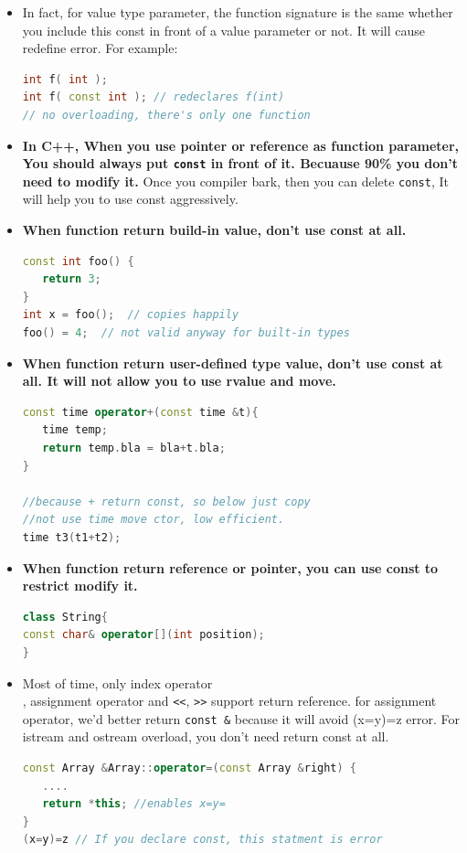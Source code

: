 \documentclass[a4paper,12pt,twoside]{book}
\begin{document}
\begin{itemize}
\item In fact, for value type parameter, the function signature is the same whether you include this const in front of a value parameter or not. It will cause redefine error. For example:
\begin{lstlisting}[frame=single, language=c++]
int f( int );
int f( const int ); // redeclares f(int)
// no overloading, there's only one function
\end{lstlisting}

\item \textbf{In C++, When you use pointer or reference as function parameter, You should always put \texttt{const} in front of it. Becuause 90\% you don't need to modify it. }Once you compiler bark, then you can delete \texttt{const}, It will help you to use const aggressively.

\item \textbf{When function return build-in value, don't use const at all. }
\begin{lstlisting}[frame=single, language=c++]
const int foo() {
   return 3;
}
int x = foo();  // copies happily
foo() = 4;  // not valid anyway for built-in types
\end{lstlisting}

\item \textbf{When function return user-defined type value, don't use const at all. It will not allow you to use rvalue and move. }
\begin{lstlisting}[frame=single, language=c++]
const time operator+(const time &t){
   time temp;
   return temp.bla = bla+t.bla;
}

//because + return const, so below just copy
//not use time move ctor, low efficient.
time t3(t1+t2);
\end{lstlisting}

\item \textbf{When function return reference or pointer, you can use const to restrict modify it.}
\begin{lstlisting}[frame=single, language=c++]
class String{
const char& operator[](int position);
}
\end{lstlisting}

\item Most of time, only index operator \[\], assignment operator and \texttt{<<}, \texttt{>>} support return reference. for assignment operator, we'd better return \texttt{const \&} because it will avoid (x=y)=z error. For istream and ostream overload, you don't need return const at all. 
\begin{lstlisting}[frame=single, language=c++]
const Array &Array::operator=(const Array &right) {
   ....
   return *this; //enables x=y= 
}
(x=y)=z // If you declare const, this statment is error
\end{lstlisting}



\end{itemize}
\end{document}
